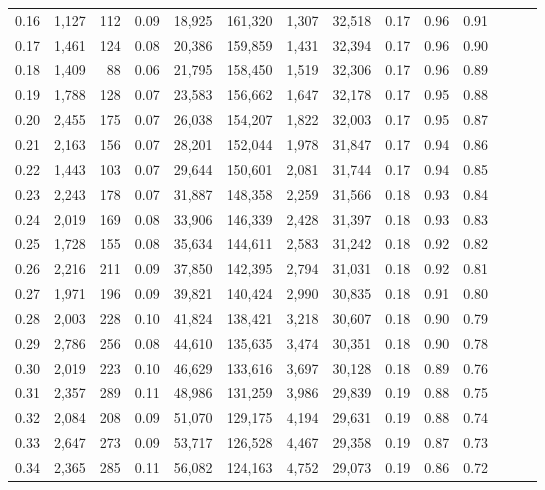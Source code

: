\begin{tabular}{rrrrrrrrrrrrrr}
0.16 &  1,127 &  112 &  0.09 &   18,925 &  161,320 &   1,307 &  32,518 &  0.17 &  0.96 &      0.91 \\
0.17 &  1,461 &  124 &  0.08 &   20,386 &  159,859 &   1,431 &  32,394 &  0.17 &  0.96 &      0.90 \\
0.18 &  1,409 &   88 &  0.06 &   21,795 &  158,450 &   1,519 &  32,306 &  0.17 &  0.96 &      0.89 \\
0.19 &  1,788 &  128 &  0.07 &   23,583 &  156,662 &   1,647 &  32,178 &  0.17 &  0.95 &      0.88 \\
0.20 &  2,455 &  175 &  0.07 &   26,038 &  154,207 &   1,822 &  32,003 &  0.17 &  0.95 &      0.87 \\
0.21 &  2,163 &  156 &  0.07 &   28,201 &  152,044 &   1,978 &  31,847 &  0.17 &  0.94 &      0.86 \\
0.22 &  1,443 &  103 &  0.07 &   29,644 &  150,601 &   2,081 &  31,744 &  0.17 &  0.94 &      0.85 \\
0.23 &  2,243 &  178 &  0.07 &   31,887 &  148,358 &   2,259 &  31,566 &  0.18 &  0.93 &      0.84 \\
0.24 &  2,019 &  169 &  0.08 &   33,906 &  146,339 &   2,428 &  31,397 &  0.18 &  0.93 &      0.83 \\
0.25 &  1,728 &  155 &  0.08 &   35,634 &  144,611 &   2,583 &  31,242 &  0.18 &  0.92 &      0.82 \\
0.26 &  2,216 &  211 &  0.09 &   37,850 &  142,395 &   2,794 &  31,031 &  0.18 &  0.92 &      0.81 \\
0.27 &  1,971 &  196 &  0.09 &   39,821 &  140,424 &   2,990 &  30,835 &  0.18 &  0.91 &      0.80 \\
0.28 &  2,003 &  228 &  0.10 &   41,824 &  138,421 &   3,218 &  30,607 &  0.18 &  0.90 &      0.79 \\
0.29 &  2,786 &  256 &  0.08 &   44,610 &  135,635 &   3,474 &  30,351 &  0.18 &  0.90 &      0.78 \\
0.30 &  2,019 &  223 &  0.10 &   46,629 &  133,616 &   3,697 &  30,128 &  0.18 &  0.89 &      0.76 \\
0.31 &  2,357 &  289 &  0.11 &   48,986 &  131,259 &   3,986 &  29,839 &  0.19 &  0.88 &      0.75 \\
0.32 &  2,084 &  208 &  0.09 &   51,070 &  129,175 &   4,194 &  29,631 &  0.19 &  0.88 &      0.74 \\
0.33 &  2,647 &  273 &  0.09 &   53,717 &  126,528 &   4,467 &  29,358 &  0.19 &  0.87 &      0.73 \\
0.34 &  2,365 &  285 &  0.11 &   56,082 &  124,163 &   4,752 &  29,073 &  0.19 &  0.86 &      0.72 \\

\end{tabular}

